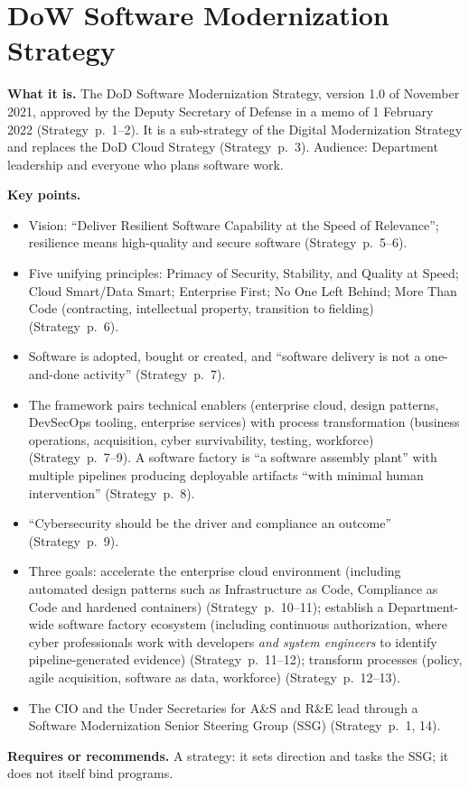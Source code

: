 \documentclass[11pt,letterpaper,twoside,openany]{memoir}
\newcommand{\pg}[2]{{\small(#1~p.~#2)}}          %
\begin{document}
\section{DoW Software Modernization Strategy}
\textbf{What it is.} The DoD Software Modernization Strategy, version 1.0 of November 2021, approved by the Deputy
Secretary of Defense in a memo of 1 February 2022 \pg{Strategy}{1--2}. It is a sub-strategy of the Digital Modernization
Strategy and replaces the DoD Cloud Strategy \pg{Strategy}{3}. Audience: Department leadership and everyone who plans
software work.

\textbf{Key points.}
\begin{itemize}
\item Vision: ``Deliver Resilient Software Capability at the Speed of Relevance''; resilience means high-quality and
  secure software \pg{Strategy}{5--6}.
\item Five unifying principles: Primacy of Security, Stability, and Quality at Speed; Cloud Smart/Data Smart; Enterprise
  First; No One Left Behind; More Than Code (contracting, intellectual property, transition to fielding) \pg{Strategy}{6}.
\item Software is adopted, bought or created, and ``software delivery is not a one-and-done activity'' \pg{Strategy}{7}.
\item The framework pairs technical enablers (enterprise cloud, design patterns, DevSecOps tooling, enterprise
  services) with process transformation (business operations, acquisition, cyber survivability, testing, workforce)
  \pg{Strategy}{7--9}. A software factory is ``a software assembly plant'' with multiple pipelines producing deployable
  artifacts ``with minimal human intervention'' \pg{Strategy}{8}.
\item ``Cybersecurity should be the driver and compliance an outcome'' \pg{Strategy}{9}.
\item Three goals: accelerate the enterprise cloud environment (including automated design patterns such as
  Infrastructure as Code, Compliance as Code and hardened containers) \pg{Strategy}{10--11}; establish a
  Department-wide software factory ecosystem (including continuous authorization, where cyber professionals work with
  developers \emph{and system engineers} to identify pipeline-generated evidence) \pg{Strategy}{11--12}; transform
  processes (policy, agile acquisition, software as data, workforce) \pg{Strategy}{12--13}.
\item The CIO and the Under Secretaries for A\&S and R\&E lead through a Software Modernization Senior Steering Group
  (SSG) \pg{Strategy}{1, 14}.
\end{itemize}
\textbf{Requires or recommends.} A strategy: it sets direction and tasks the SSG; it does not itself bind programs.
\end{document}
